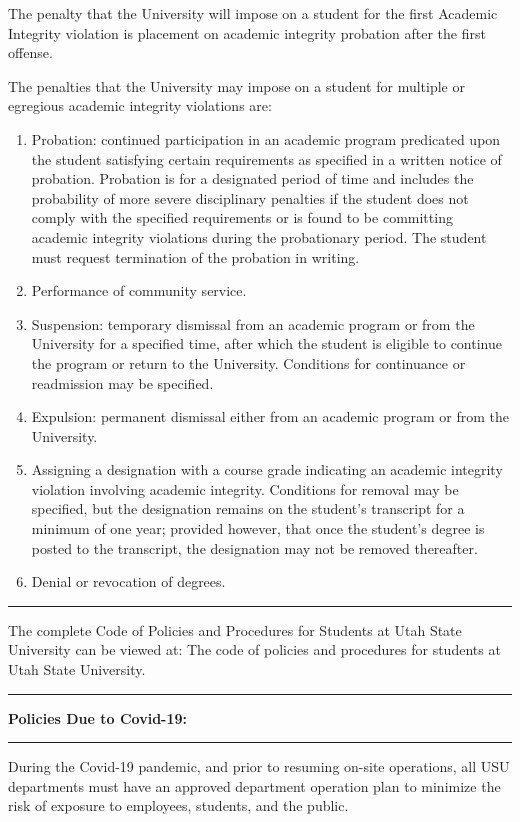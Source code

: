 \documentclass[10pt,fleqn]{article}
\begin{document}
The penalty that the University will impose on a student for the first Academic
Integrity violation is placement on academic integrity probation after the first
offense.

The penalties that the University may impose on a student for multiple or
egregious academic integrity violations are:
\begin{enumerate}
  \item Probation: continued participation in an academic program predicated
        upon the student satisfying certain requirements as specified in a
        written notice of probation. Probation is for a designated period of
        time and includes the probability of more severe disciplinary penalties
        if the student does not comply with the specified requirements or is
        found to be committing academic integrity violations during the
        probationary period. The student must request termination of the
        probation in writing.
  \item Performance of community service.
  \item Suspension: temporary dismissal from an academic program or from the
        University for a specified time, after which the student is eligible to
        continue the program or return to the University. Conditions for
        continuance or readmission may be specified.
  \item Expulsion: permanent dismissal either from an academic program or from
        the University.
  \item Assigning a designation with a course grade indicating an academic
        integrity violation involving academic integrity. Conditions for removal
        may be specified, but the designation remains on the student's
        transcript for a minimum of one year; provided however, that once the
        student's degree is posted to the transcript, the designation may not be
        removed thereafter.
  \item Denial or revocation of degrees.
\end{enumerate}
\vskip0.1in\hrule\vskip0.1in\noindent
The complete Code of Policies and Procedures for Students at Utah State
University can be viewed at: The code of policies and procedures for students at
Utah State University.
\vskip0.1in\hrule\vskip0.1in
\noindent
{\bf Policies Due to Covid-19:}
\vskip0.1in\hrule\vskip0.1in \noindent
During the Covid-19 pandemic, and prior to resuming on-site operations, all USU
departments must have an approved department operation plan to minimize the
risk of exposure to employees, students, and the public. 
\end{document}
